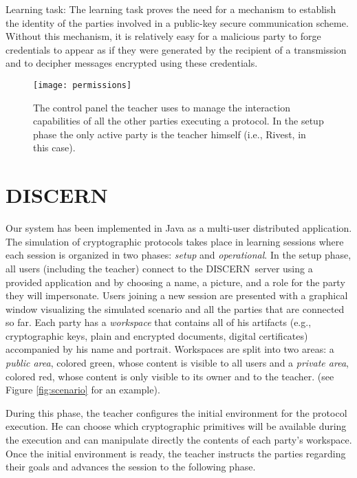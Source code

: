 \documentclass[conference]{IEEEtran}
\def\disgrace{DISCERN}
\begin{document}
{\sc Learning task:} The learning task proves the need
for a mechanism to establish the identity of the parties
involved in a public-key secure communication scheme.
Without this mechanism, it is relatively easy for
a malicious party to forge credentials to appear as if
they were generated by the recipient of a transmission
and to decipher messages encrypted using these credentials.

\begin{figure*}
\centering
\texttt{[image: permissions]}
\caption{The control panel the teacher uses to manage the interaction
  capabilities of all the other parties executing a protocol. In the
  setup phase the only active party is the teacher himself (i.e.,
  Rivest, in this case).}
\label{fig:permissions}
\end{figure*}


\section{DISCERN}
\label{sec:dgrace}
Our system has been implemented in Java as a multi-user distributed
application. The simulation of cryptographic protocols takes place in
learning sessions where each session is organized in two phases:
{\em setup} and {\em operational}. In the setup phase, all users
(including the teacher) connect to the \disgrace\ server using
a provided application and by choosing a name, a picture, and a
role for the party they will impersonate.  Users joining a new
session are presented with a graphical window visualizing
the simulated scenario and all the parties that are connected so far.
Each party has a {\em workspace} that contains all of his artifacts
(e.g., cryptographic keys, plain and encrypted documents, digital
certificates) accompanied by his name and portrait.
Workspaces are split into two areas: a {\em public area},
colored green, whose content is visible to all users and
a {\em private area}, colored red, whose content is only
visible to its owner and to the teacher. (see Figure \ref{fig:scenario} for an example).

During this phase, the teacher configures the initial environment
for the protocol execution. He can choose which cryptographic
primitives will be available during the execution and can manipulate
directly the contents of each party's workspace. Once the initial
environment is ready, the teacher instructs the parties regarding their goals and advances the session to the following phase. 
\end{document}
